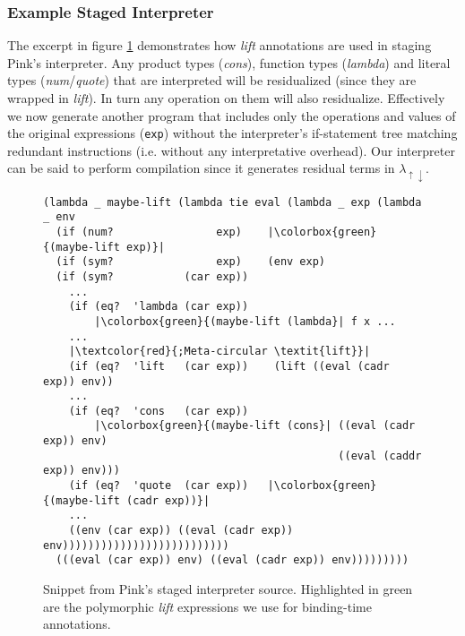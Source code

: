 \documentclass[a4paper,12pt,twoside,openright]{report}
\theoremstyle{definition}
\newcommand{\mslang}{$\lambda_{\uparrow\downarrow}$}
\begin{document}
\subsubsection{Example Staged Interpreter}\label{ssubsec:stage_ex}
The excerpt in figure \ref{fig:pink_source} demonstrates how \textit{lift} annotations are used in staging Pink's interpreter. Any product types (\textit{cons}), function types (\textit{lambda}) and literal types (\textit{num}/\textit{quote}) that are interpreted will be residualized (since they are wrapped in \textit{lift}). In turn any operation on them will also residualize. Effectively we now generate another program that includes only the operations and values of the original expressions (\texttt{exp}) without the interpreter's if-statement tree matching redundant instructions (i.e. without any interpretative overhead). Our interpreter can be said to perform compilation since it generates residual terms in \mslang.

\begin{figure}[ht!]
\begin{verbatim}
(lambda _ maybe-lift (lambda tie eval (lambda _ exp (lambda _ env
  (if (num?                exp)    |\colorbox{green}{(maybe-lift exp)}|
  (if (sym?                exp)    (env exp)
  (if (sym?           (car exp))
    ...
    (if (eq?  'lambda (car exp))
        |\colorbox{green}{(maybe-lift (lambda}| f x ...
    ...
    |\textcolor{red}{;Meta-circular \textit{lift}}|
    (if (eq?  'lift   (car exp))    (lift ((eval (cadr exp)) env))
    ...
    (if (eq?  'cons   (car exp))
        |\colorbox{green}{(maybe-lift (cons}| ((eval (cadr exp)) env)
                                              ((eval (caddr exp)) env)))
    (if (eq?  'quote  (car exp))   |\colorbox{green}{(maybe-lift (cadr exp))}|
    ...
    ((env (car exp)) ((eval (cadr exp)) env))))))))))))))))))))))))))
  (((eval (car exp)) env) ((eval (cadr exp)) env)))))))))
\end{verbatim}
\caption{Snippet from Pink's staged interpreter source. Highlighted in green are the polymorphic \textit{lift} expressions we use for binding-time annotations.}
\label{fig:pink_source}
\end{figure}
\end{document}
